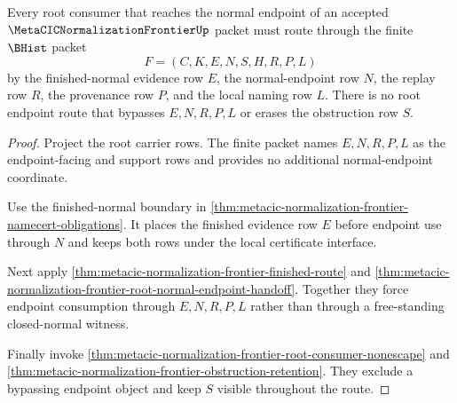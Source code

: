 \begin{theorem}
\label{thm:metacic-normalization-frontier-root-normal-endpoint-route-exhaustion}
Every root consumer that reaches the normal endpoint of an accepted $\MetaCICNormalizationFrontierUp$ packet must route through the finite $\BHist$ packet
$$
F=(C,K,E,N,S,H,R,P,L)
$$
by the finished-normal evidence row $E$, the normal-endpoint row $N$, the replay row $R$, the provenance row $P$, and the local naming row $L$. There is no root endpoint route that bypasses $E,N,R,P,L$ or erases the obstruction row $S$.
\end{theorem}
\begin{proof}
Project the root carrier rows. The finite packet names $E,N,R,P,L$ as the endpoint-facing and support rows and provides no additional normal-endpoint coordinate.

Use the finished-normal boundary in \autoref{thm:metacic-normalization-frontier-namecert-obligations}. It places the finished evidence row $E$ before endpoint use through $N$ and keeps both rows under the local certificate interface.

Next apply \autoref{thm:metacic-normalization-frontier-finished-route} and \autoref{thm:metacic-normalization-frontier-root-normal-endpoint-handoff}. Together they force endpoint consumption through $E,N,R,P,L$ rather than through a free-standing closed-normal witness.

Finally invoke \autoref{thm:metacic-normalization-frontier-root-consumer-nonescape} and \autoref{thm:metacic-normalization-frontier-obstruction-retention}. They exclude a bypassing endpoint object and keep $S$ visible throughout the route.
\end{proof}

